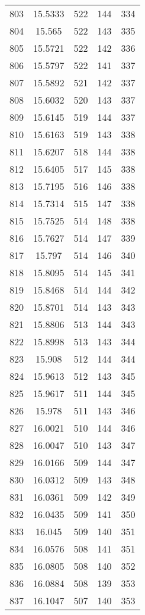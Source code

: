 \documentclass[12pt,a4paper]{article}
\begin{document}
\begin{tabular}{r|cccc}
	803 & 15.5333 & 522 & 144 & 334 \\
	804 & 15.565 & 522 & 143 & 335 \\
	805 & 15.5721 & 522 & 142 & 336 \\
	806 & 15.5797 & 522 & 141 & 337 \\
	807 & 15.5892 & 521 & 142 & 337 \\
	808 & 15.6032 & 520 & 143 & 337 \\
	809 & 15.6145 & 519 & 144 & 337 \\
	810 & 15.6163 & 519 & 143 & 338 \\
	811 & 15.6207 & 518 & 144 & 338 \\
	812 & 15.6405 & 517 & 145 & 338 \\
	813 & 15.7195 & 516 & 146 & 338 \\
	814 & 15.7314 & 515 & 147 & 338 \\
	815 & 15.7525 & 514 & 148 & 338 \\
	816 & 15.7627 & 514 & 147 & 339 \\
	817 & 15.797 & 514 & 146 & 340 \\
	818 & 15.8095 & 514 & 145 & 341 \\
	819 & 15.8468 & 514 & 144 & 342 \\
	820 & 15.8701 & 514 & 143 & 343 \\
	821 & 15.8806 & 513 & 144 & 343 \\
	822 & 15.8998 & 513 & 143 & 344 \\
	823 & 15.908 & 512 & 144 & 344 \\
	824 & 15.9613 & 512 & 143 & 345 \\
	825 & 15.9617 & 511 & 144 & 345 \\
	826 & 15.978 & 511 & 143 & 346 \\
	827 & 16.0021 & 510 & 144 & 346 \\
	828 & 16.0047 & 510 & 143 & 347 \\
	829 & 16.0166 & 509 & 144 & 347 \\
	830 & 16.0312 & 509 & 143 & 348 \\
	831 & 16.0361 & 509 & 142 & 349 \\
	832 & 16.0435 & 509 & 141 & 350 \\
	833 & 16.045 & 509 & 140 & 351 \\
	834 & 16.0576 & 508 & 141 & 351 \\
	835 & 16.0805 & 508 & 140 & 352 \\
	836 & 16.0884 & 508 & 139 & 353 \\
	837 & 16.1047 & 507 & 140 & 353 \\

\end{tabular}
\end{document}
